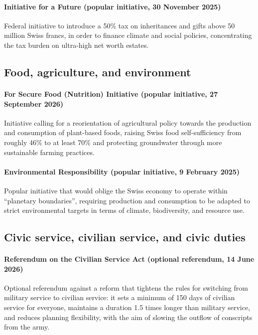 \documentclass[11pt]{article}
\begin{document}
\paragraph{Initiative for a Future (popular initiative, 30 November 2025)}
Federal initiative to introduce a 50\% tax on inheritances and gifts above 50 million Swiss francs, in order to finance climate and social policies, concentrating the tax burden on ultra-high net worth estates.

\subsection*{Food, agriculture, and environment}

\paragraph{For Secure Food (Nutrition) Initiative (popular initiative, 27 September 2026)}
Initiative calling for a reorientation of agricultural policy towards the production and consumption of plant-based foods, raising Swiss food self-sufficiency from roughly 46\% to at least 70\% and protecting groundwater through more sustainable farming practices.

\paragraph{Environmental Responsibility (popular initiative, 9 February 2025)}
Popular initiative that would oblige the Swiss economy to operate within ``planetary boundaries'', requiring production and consumption to be adapted to strict environmental targets in terms of climate, biodiversity, and resource use.

\subsection*{Civic service, civilian service, and civic duties}

\paragraph{Referendum on the Civilian Service Act (optional referendum, 14 June 2026)}
Optional referendum against a reform that tightens the rules for switching from military service to civilian service: it sets a minimum of 150 days of civilian service for everyone, maintains a duration 1.5 times longer than military service, and reduces planning flexibility, with the aim of slowing the outflow of conscripts from the army.
\end{document}
